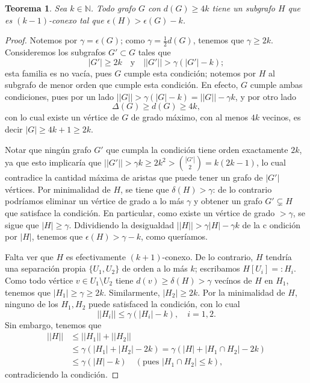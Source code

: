 \documentclass[12pt]{report}
\theoremstyle{plain}
\newtheorem{theorem}{Teorema}[section]
\theoremstyle{definition}
\newcommand{\naturals}{\mathbb{N}}
\newcommand{\abs}[1]{\left \vert #1 \right \vert}
\newcommand{\Abs}[1]{\left \vert \left \vert #1 \right \vert \right \vert}
\begin{document}
\begin{theorem}
Sea $k \in \naturals$. Todo grafo $G$ con $d(G) \geq 4 k$ tiene un subgrafo $H$ que es $(k-1)$-conexo tal que $\epsilon (H) > \epsilon (G) -k$.
\end{theorem}
\begin{proof}
Notemos por $\gamma = \epsilon (G)$; como $\gamma = \frac 1 2 d(G)$, tenemos que $\gamma \geq 2 k$. Consideremos los subgrafos $G' \subset G$ tales que
\[
    \abs{G'} \geq 2k \quad \text{y} \quad \Abs{G'}> \gamma ( \abs{G'}-k);
\]
esta familia es no vacía, pues $G$ cumple esta condición; notemos por $H$ al subgrafo de menor orden que cumple esta condición.
En efecto, $G$ cumple ambas condiciones, pues por un lado $\Abs G > \gamma (\abs G - k) = \Abs G - \gamma k$, y por otro lado
$$
\Delta (G) \geq d(G) \geq 4k,
$$
con lo cual existe un vértice de $G$ de grado máximo, con al menos $4k$ vecinos, es decir $\abs G \geq 4k +1 \geq 2k$.

Notar que ningún grafo $G'$ que cumpla la condición tiene orden exactamente $2k$, ya que esto implicaría que $\Abs {G'} > \gamma k \geq 2k^2 > \binom{\abs {G'}}{2} = k(2k-1)$, lo cual contradice la cantidad máxima de aristas que puede tener un grafo de $\abs{G'}$ vértices.
Por minimalidad de $H$, se tiene que $\delta (H) > \gamma$: de lo contrario podríamos eliminar un vértice de grado a lo más $\gamma$ y obtener un grafo $G' \subsetneq H$ que satisface la condición. En particular, como existe un vértice de grado $> \gamma$, se sigue que $\abs H \geq \gamma$. Ddividiendo la desigualdad $\Abs H > \gamma \abs H - \gamma k$ de la c ondición por $\abs H$, tenemos que $\epsilon (H) > \gamma - k$, como queríamos.

Falta ver que $H$ es efectivamente $(k+1)$-conexo. De lo contrario, $H$ tendría una separación propia $\{U_1, U_2\}$ de orden a lo más $k$; escribamos $H[U_i] =: H_i$. Como todo vértice $v \in U_1 \setminus U_{2}$ tiene $d(v) \geq \delta (H) > \gamma$ vecínos de $H$ en $H_1$, tenemos que $\abs{H_1}\geq \gamma \geq 2k$. Similarmente, $\abs{H_2} \geq 2k$. Por la minimalidad de $H$, ninguno de los $H_1,H_2$ puede satisfaced la condición, con lo cual
\[
    \Abs {H_i} \leq \gamma (\abs{H_i}-k), \quad i = 1,2.
\]
Sin embargo, tenemos que
\begin{align*}
\Abs H &\leq \Abs {H_1} + \Abs{H_2} \\
    &\leq \gamma (\abs {H_1} + \abs{H_2} -2k) = \gamma (\abs{H}+ \abs{H_1 \cap H_2}-2k) \\
    &\leq \gamma (\abs H - k) \quad (\text{pues $\abs{H_1\cap H_2} \leq k$}),
\end{align*}
contradiciendo la condición.
\end{proof}
\end{document}

